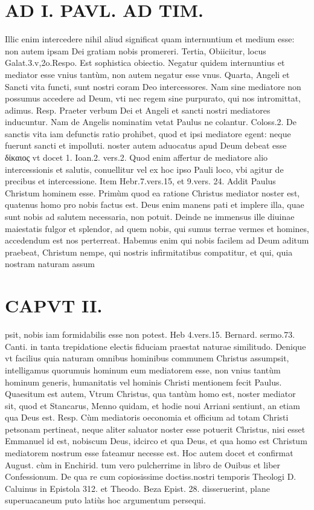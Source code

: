 \documentclass{article}
\begin{document}
\begin{pages}
\section*{AD I. PAVL. AD TIM. }
\marginpar{[ p.58 ]}\pstart Illic enim intercedere nihil aliud significat quam internuntium et medium esse: non autem ipsam Dei gratiam nobis promereri.  \pend\pstart Tertia, Obiicitur, locus Galat.3.v,2o.Respo. Est sophistica obiectio. Negatur quidem internuntius et mediator esse vnius tantùm, non autem negatur esse vnus.  \pend\pstart Quarta, Angeli et Sancti vita functi, sunt nostri coram Deo intercessores. Nam sine mediatore non possumus accedere ad Deum, vti nec regem sine purpurato, qui nos intromittat, adimus. Resp. Praeter verbum Dei et Angeli et sancti nostri mediatores inducuntur. Nam de Angelis nominatim vetat Paulus ne colantur. Coloss.2. De sanctis vita iam defunctis ratio prohibet, quod et ipsi mediatore egent: neque fuerunt sancti et impolluti. noster autem aduocatus apud Deum debeat esse δίκαιος vt docet 1. Ioan.2. vers.2.  \pend\pstart Quod enim affertur de mediatore alio intercessionis et salutis, conuellitur vel ex hoc ipso Pauli loco, vbi agitur de precibus et intercessione. Item Hebr.7.vers.15, et 9.vers. 24.  \pend\pstart Addit Paulus Christum hominem esse. Primùm quod ea ratione Christus mediator noster est, quatenus homo pro nobis factus est. Deus enim manens pati et implere illa, quae sunt nobis ad salutem necessaria, non potuit. Deinde ne immensus ille diuinae maiestatis fulgor et splendor, ad quem nobis, qui sumus terrae vermes et homines, accedendum est nos perterreat. Habemus enim qui nobis facilem ad Deum aditum praebeat, Christum nempe, qui nostris infirmitatibus compatitur, et qui, quia nostram naturam assum\pend
\section*{CAPVT II. }
\marginpar{[ p.58 ]}\pstart psit, nobis iam formidabilis esse non potest. Heb 4.vers.15. Bernard. sermo.73. Canti. in tanta trepidatione electis fiduciam praestat naturae similitudo. Denique vt facilius quia naturam omnibus hominibus communem Christus assumpsit, intelligamus quorumuis hominum eum mediatorem esse, non vnius tantùm hominum generis, humanitatis vel hominis Christi mentionem fecit Paulus.  \pend\pstart Quaesitum est autem, Vtrum Christus, qua tantùm homo est, noster mediator sit, quod et Stancarus, Menno quidam, et hodie noui Arriani sentiunt, an etiam qua Deus est. Resp. Cùm mediatoris oeconomia et officium ad totam Christi petsonam pertineat, neque aliter saluator noster esse potuerit Christus, nisi esset Emmanuel id est, nobiscum Deus, idcirco et qua Deus, et qua homo est Christum mediatorem nostrum esse fateamur necesse est.  \pend\pstart Hoc autem docet et confirmat August. cùm in Enchirid. tum vero pulcherrime in libro de Ouibus  et liber  Confessionum. De qua re cum copiosissime doctiss.nostri temporis Theologi D. Caluinus in Epistola 312. et Theodo. Beza Epist. 28. disseruerint, plane superuacaneum puto latiùs hoc argumentum persequi.  \pend
{}
{}

\end{pages}
\end{document}

